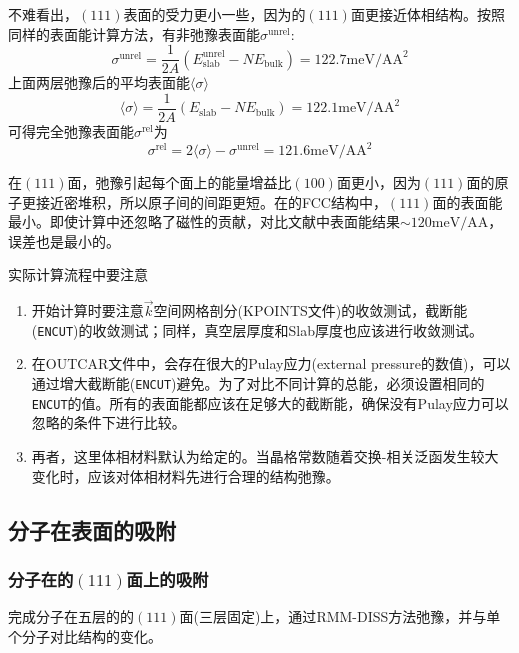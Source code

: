 不难看出，$(111)$表面的受力更小一些，因为的$(111)$面更接近体相结构。按照同样的表面能计算方法，有非弛豫表面能$\sigma^{\mathrm{unrel}}$:
\begin{displaymath}
	\sigma^{\mathrm{unrel}}=\dfrac1{2A}(E_{\mathrm{slab}}^{\mathrm{unrel}}-NE_{\mathrm{bulk}})=122.7\mathrm{meV/AA^2}
\end{displaymath}
上面两层弛豫后的平均表面能$\langle\sigma\rangle$
\begin{displaymath}
	\langle\sigma\rangle=\dfrac1{2A}(E_{\mathrm{slab}}-NE_{\mathrm{bulk}})=122.1\mathrm{meV/AA^2}
\end{displaymath}
可得完全弛豫表面能$\sigma^{\mathrm{rel}}$为
\begin{displaymath}
	\sigma^{\mathrm{rel}}=2\langle\sigma\rangle-\sigma^{\mathrm{unrel}}=121.6\mathrm{meV/AA^2}
\end{displaymath}

在$(111)$面，弛豫引起每个面上的能量增益比$(100)$面更小，因为$(111)$面的原子更接近密堆积，所以原子间的间距更短。在的\textrm{FCC}结构中，$(111)$面的表面能最小。即使计算中还忽略了磁性的贡献，对比文献中表面能结果$\sim120\mathrm{meV/AA}$，误差也是最小的。

实际计算流程中要注意
\begin{enumerate}
	\item 开始计算时要注意$\vec k$空间网格剖分(\textrm{KPOINTS}文件)的收敛测试，截断能(\texttt{ENCUT})的收敛测试；同样，真空层厚度和\textrm{Slab}厚度也应该进行收敛测试。
	\item 在\textrm{OUTCAR}文件中，会存在很大的\textrm{Pulay}应力(\textrm{external pressure}的数值)，可以通过增大截断能(\texttt{ENCUT})避免。为了对比不同计算的总能，必须设置相同的\texttt{ENCUT}的值。所有的表面能都应该在足够大的截断能，确保没有\textrm{Pulay}应力可以忽略的条件下进行比较。
	\item 再者，这里体相材料默认为给定的。当晶格常数随着交换-相关泛函发生较大变化时，应该对体相材料先进行合理的结构弛豫。
\end{enumerate}

\subsection{分子在表面的吸附}
\subsubsection{分子在的$(111)$面上的吸附}
完成分子在五层的的$(111)$面(三层固定)上，通过\textrm{RMM-DISS}方法弛豫，并与单个分子对比结构的变化。

